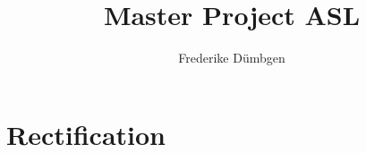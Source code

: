 \documentclass{report}
\begin{document}
\title{Master Project ASL}
\author{Frederike Dümbgen}

\maketitle

\chapter{Rectification}

\end{document}
